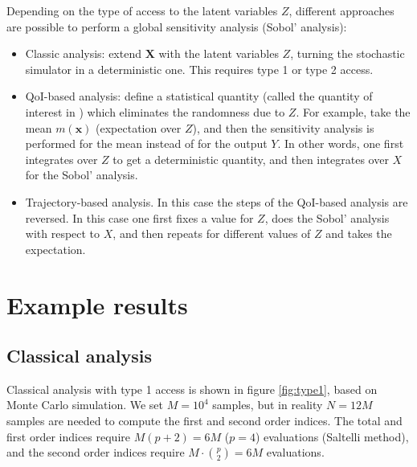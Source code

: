 \documentclass{elsarticle}
\newcommand{\vt}[1]{\bm{#1}}
\begin{document}
Depending on the type of access to the latent variables $Z$, different approaches are possible to perform a global sensitivity analysis (Sobol' analysis):
\begin{itemize}
\item Classic analysis: extend $\vt{X}$ with the latent variables $Z$, turning the stochastic simulator in a deterministic one. This requires type 1 or type 2 access.
\item QoI-based analysis: define a statistical quantity (called the quantity of interest in \cite{Zhu2020a}) which eliminates the randomness due to $Z$. For example, take the mean $m(\vt{x})$ (expectation over $Z$), and then the sensitivity analysis is performed for the mean instead of for the output $Y$. In other words, one first integrates over $Z$ to get a deterministic quantity, and then integrates over $X$ for the Sobol' analysis.
\item Trajectory-based analysis. In this case the steps of the QoI-based analysis are reversed. In this case one first fixes a value for $Z$, does the Sobol' analysis with respect to $X$, and then repeats for different values of $Z$ and takes the expectation.
\end{itemize}


\section{Example results}
\subsection{Classical analysis}
Classical analysis with type 1 access is shown in figure \ref{fig:type1}, based on Monte Carlo simulation. We set $M=10^{4}$ samples, but in reality $N =12 M$ samples are needed to compute the first and second order indices. The total and first order indices require $M (p+2) = 6 M$ ($p=4$) evaluations (Saltelli method), and the second order indices require $M \cdot {p \choose 2} = 6 M$ evaluations.
\end{document}
